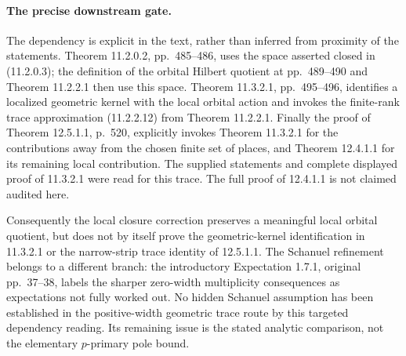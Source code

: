 \paragraph{The precise downstream gate.}
The dependency is explicit in the text, rather than inferred
from proximity of the statements.  Theorem 11.2.0.2,
pp.~485--486, uses the space asserted closed in
(11.2.0.3); the definition of the orbital Hilbert quotient
at pp.~489--490 and Theorem 11.2.2.1 then use this space.
Theorem 11.3.2.1, pp.~495--496, identifies a localized
geometric kernel with the local orbital action and invokes
the finite-rank trace approximation (11.2.2.12) from
Theorem 11.2.2.1.  Finally the proof of Theorem 12.5.1.1,
p.~520, explicitly invokes Theorem 11.3.2.1 for the
contributions away from the chosen finite set of places,
and Theorem 12.4.1.1 for its remaining local contribution.
The supplied statements and complete displayed proof of
11.3.2.1 were read for this trace.  The full proof of
12.4.1.1 is not claimed audited here.

Consequently the local closure correction preserves a
meaningful local orbital quotient, but does not by itself
prove the geometric-kernel identification in 11.3.2.1
or the narrow-strip trace identity of 12.5.1.1.
The Schanuel refinement belongs to a different branch:
the introductory Expectation 1.7.1, original pp.~37--38,
labels the sharper zero-width multiplicity consequences
as expectations not fully worked out.  No hidden Schanuel
assumption has been established in the positive-width
geometric trace route by this targeted dependency reading.
Its remaining issue is the stated analytic comparison,
not the elementary $p$-primary pole bound.
